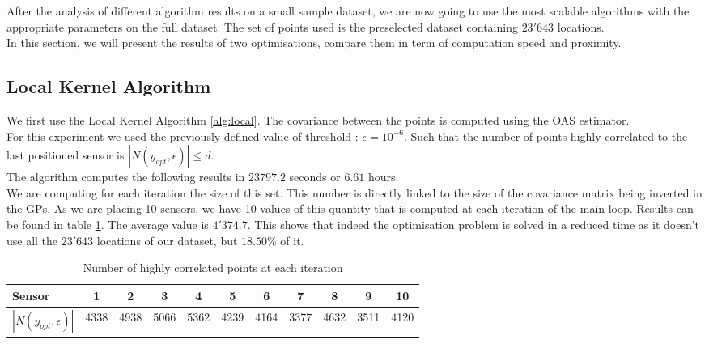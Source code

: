 After the analysis of different algorithm results on a small sample dataset, we are now going to use the most scalable algorithms with the appropriate parameters on the full dataset. The set of points used is the preselected dataset containing $23'643$ locations. \\

In this section, we will present the results of two optimisations, compare them in term of computation speed and proximity. 

\subsection{Local Kernel Algorithm}

We first use the Local Kernel Algorithm \ref{alg:local}. The covariance between the points is computed using the OAS estimator. \\


For this experiment we used the previously defined value of threshold : $\epsilon = 10^{-6}$. Such that the number of points highly correlated to the last positioned sensor is $|N(y_{opt},\epsilon)| \leq d $. \\ 

The algorithm computes the following results in $23797.2$ seconds or $6.61$ hours. \\

We are computing for each iteration the size of this set. This number is directly linked to the size of the covariance matrix being inverted in the GPs. As we are placing 10 sensors, we have 10 values of this quantity that is computed at each iteration of the main loop. Results can be found in table \ref{tab:full:d_opt}. The average value is $4'374.7$. This shows that indeed the optimisation problem is solved in a reduced time as it doesn't use all the $23'643$ locations of our dataset, but $18.50$\% of it.   \\

\begin{table}[h]
    \centering
    \begin{tabular}{|l|cccccccccc|}
    \hline
    Sensor & 1 & 2 & 3 & 4 & 5 & 6 & 7 & 8 & 9 & 10 \\     \hline
        $|N(y_{opt},\epsilon)|$ & 4338 & 4938 & 5066 & 5362 & 4239 & 4164 & 3377 & 4632 & 3511 & 4120 \\     \hline

    \end{tabular}
    \caption{Number of highly correlated points at each iteration}
    \label{tab:full:d_opt}
\end{table}



